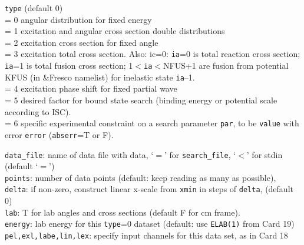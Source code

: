 \documentclass[11pt]{article}
\begin{document}
{\tt type} (default 0)
\\ = 0 angular distribution for fixed energy
\\ = 1 excitation and angular cross section double distributions
\\ = 2 excitation cross section for fixed angle
\\ = 3 excitation total cross section. Also: ic=0: {\tt ia}=0 is total reaction cross section;
{\tt ia}=1 is total fusion cross section; 1$<${\tt ia}$<$NFUS+1 are fusion from potential
KFUS (in \&Fresco namelist) for inelastic state {\tt ia}--1.
\\ = 4 excitation phase shift for fixed partial wave
\\ = 5 desired factor for bound state search (binding energy or potential scale
 according to ISC).
\\ = 6 specific experimental constraint on a search parameter {\tt par},
    to be {\tt value} with error {\tt error} ({\tt abserr}=T or F).


{\tt data\_file}: name of data file with data, `$=$' for {\tt search\_file},
 `$<$' for stdin (default `$=$')\\
{\tt points}: number of data points (default: keep reading as many as possible),
\\
{\tt delta}: if non-zero, construct linear x-scale from {\tt xmin} in steps of {\tt delta},
 (default 0)\\
{\tt lab}: T  for lab angles and cross sections (default F for cm frame).\\
{\tt energy}: lab energy for this {\tt type}=0 dataset (default: use {\tt ELAB(1)} from Card 19)\\{\tt pel,exl,labe,lin,lex}: specify input channels for this data set, as in Card 18
\end{document}
